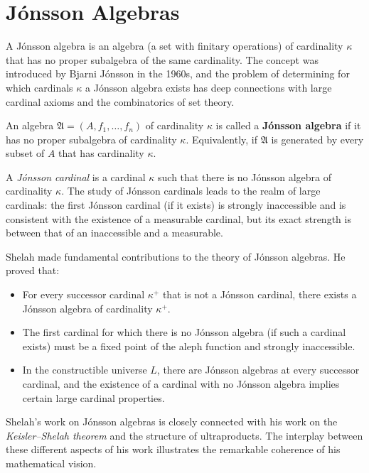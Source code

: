 \section{J\'onsson Algebras}

A J\'onsson algebra is an algebra (a set with finitary operations) of cardinality \(\kappa\) that has no proper subalgebra of the same cardinality. The concept was introduced by Bjarni J\'onsson in the 1960s, and the problem of determining for which cardinals \(\kappa\) a J\'onsson algebra exists has deep connections with large cardinal axioms and the combinatorics of set theory.

\begin{definition}
An algebra \(\mathfrak{A} = (A, f_1, \dots, f_n)\) of cardinality \(\kappa\) is called a \textbf{J\'onsson algebra} if it has no proper subalgebra of cardinality \(\kappa\). Equivalently, if \(\mathfrak{A}\) is generated by every subset of \(A\) that has cardinality \(\kappa\).
\end{definition}

A \emph{J\'onsson cardinal} is a cardinal \(\kappa\) such that there is no J\'onsson algebra of cardinality \(\kappa\). The study of J\'onsson cardinals leads to the realm of large cardinals: the first J\'onsson cardinal (if it exists) is strongly inaccessible and is consistent with the existence of a measurable cardinal, but its exact strength is between that of an inaccessible and a measurable.

Shelah made fundamental contributions to the theory of J\'onsson algebras. He proved that:

\begin{itemize}
    \item For every successor cardinal \(\kappa^{+}\) that is not a J\'onsson cardinal, there exists a J\'onsson algebra of cardinality \(\kappa^{+}\).
    \item The first cardinal for which there is no J\'onsson algebra (if such a cardinal exists) must be a fixed point of the aleph function and strongly inaccessible.
    \item In the constructible universe \(L\), there are J\'onsson algebras at every successor cardinal, and the existence of a cardinal with no J\'onsson algebra implies certain large cardinal properties.
\end{itemize}

Shelah's work on J\'onsson algebras is closely connected with his work on the \emph{Keisler--Shelah theorem} and the structure of ultraproducts. The interplay between these different aspects of his work illustrates the remarkable coherence of his mathematical vision.

